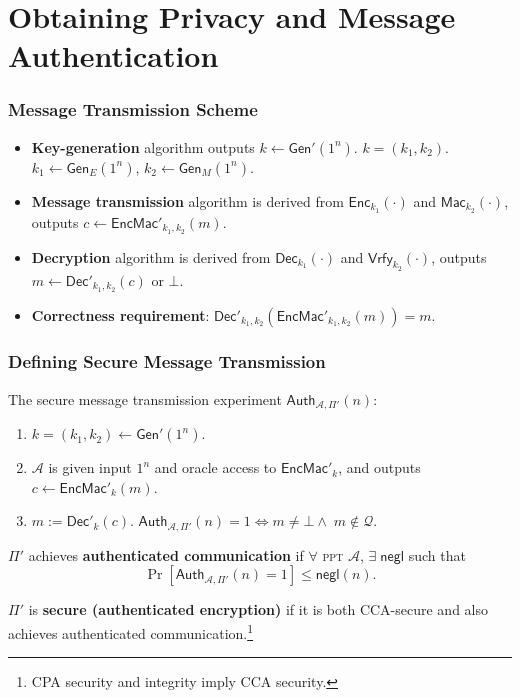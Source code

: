 \section{Obtaining Privacy and Message Authentication}
\begin{frame}\frametitle{Message Transmission Scheme}
\begin{figure}
\begin{center}

\end{center}
\end{figure}
\begin{itemize}
\item \textbf{Key-generation} algorithm outputs $k \gets \mathsf{Gen'}(1^n)$. $k = (k_1,k_2)$. $k_1 \gets \mathsf{Gen}_E(1^n)$, $k_2 \gets \mathsf{Gen}_M(1^n)$.
\item \textbf{Message transmission} algorithm is derived from $\mathsf{Enc}_{k_1}(\cdot)$ and $\mathsf{Mac}_{k_2}(\cdot)$, outputs $c \gets \mathsf{EncMac'}_{k_1,k_2}(m)$. 
\item \textbf{Decryption} algorithm is derived from $\mathsf{Dec}_{k_1}(\cdot)$ and $\mathsf{Vrfy}_{k_2}(\cdot)$, outputs $m \gets \mathsf{Dec}'_{k_1,k_2}(c)$ or $\bot$.
\item \textbf{Correctness requirement}: $\mathsf{Dec}'_{k_1,k_2}(\mathsf{EncMac}'_{k_1,k_2}(m)) = m$.
\end{itemize}
\end{frame}
\begin{frame}\frametitle{Defining Secure Message Transmission}
The secure message transmission experiment $\mathsf{Auth}_{\mathcal{A},\Pi'}(n)$:
\begin{enumerate}
\item $k = (k_1,k_2) \gets \mathsf{Gen}'(1^n)$.
\item $\mathcal{A}$ is given input $1^n$ and oracle access to $\mathsf{EncMac'}_k$, and outputs $c \gets \mathsf{EncMac'}_{k}(m)$.
\item $m := \mathsf{Dec}'_k(c)$. $\mathsf{Auth}_{\mathcal{A},\Pi'}(n) = 1 \iff m \ne \bot \land\; m \notin \mathcal{Q}$.
\end{enumerate}
\begin{definition}
$\Pi'$ achieves \textbf{authenticated communication} if $\forall$ \textsc{ppt} $\mathcal{A}$, $\exists\; \mathsf{negl}$ such that
\[ \Pr[\mathsf{Auth}_{\mathcal{A},\Pi'}(n) = 1] \le \mathsf{negl}(n).
\]
\end{definition}
\begin{definition}
$\Pi'$ is \textbf{secure (authenticated encryption)} if it is both CCA-secure and also achieves authenticated communication.\footnote{CPA security and integrity imply CCA security.}
\end{definition}
\end{frame}
